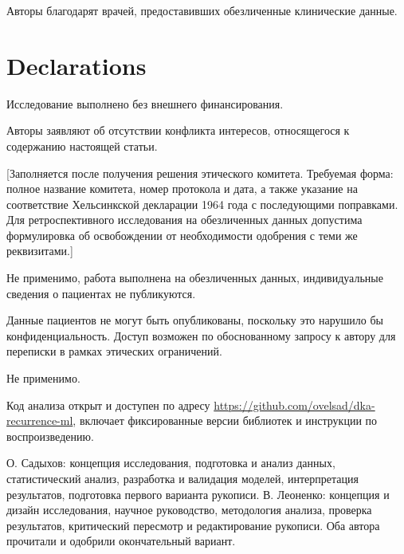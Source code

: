 \documentclass[pdflatex,sn-basic,Numbered]{sn-jnl}
\begin{document}

Авторы благодарят врачей, предоставивших обезличенные клинические данные.

\section*{Declarations}


Исследование выполнено без внешнего финансирования.


Авторы заявляют об отсутствии конфликта интересов, относящегося к содержанию настоящей статьи.


[Заполняется после получения решения этического комитета. Требуемая форма: полное название комитета, номер протокола и дата, а также указание на соответствие Хельсинкской декларации 1964 года с последующими поправками. Для ретроспективного исследования на обезличенных данных допустима формулировка об освобождении от необходимости одобрения с теми же реквизитами.]


Не применимо, работа выполнена на обезличенных данных, индивидуальные сведения о пациентах не публикуются.


Данные пациентов не могут быть опубликованы, поскольку это нарушило бы конфиденциальность. Доступ возможен по обоснованному запросу к автору для переписки в рамках этических ограничений.


Не применимо.


Код анализа открыт и доступен по адресу \url{https://github.com/ovelsad/dka-recurrence-ml}, включает фиксированные версии библиотек и инструкции по воспроизведению.


О. Садыхов: концепция исследования, подготовка и анализ данных, статистический анализ, разработка и валидация моделей, интерпретация результатов, подготовка первого варианта рукописи. В. Леоненко: концепция и дизайн исследования, научное руководство, методология анализа, проверка результатов, критический пересмотр и редактирование рукописи. Оба автора прочитали и одобрили окончательный вариант.
\end{document}
